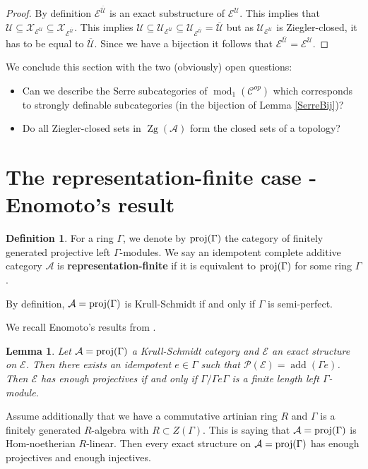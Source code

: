 \documentclass[11pt,a4paper]{amsart}
\theoremstyle{plain}
\newtheorem{lem}[thm]{Lemma}
\theoremstyle{definition}
\newtheorem{dfn}[thm]{Definition}
\DeclareMathOperator{\modu}{mod}
\newcommand{\mcA}{\mathcal{A}}
\newcommand{\mcC}{\mathcal{C}}
\newcommand{\mcE}{\mathcal{E}}
\newcommand{\mcP}{\mathcal{P}}
\newcommand{\mcU}{\mathcal{U}}
\newcommand{\mcX}{\mathcal{X}}
\DeclareMathOperator{\Zg}{Zg}
\DeclareMathOperator{\add}{add}
\begin{document}
\begin{proof}
By definition $\mcE^{\overline{\mcU}}$ is an exact substructure of $\mcE^{\mcU}$. This implies that $\mcU \subseteq \mcX_{\mcE^{\mcU}} \subseteq \mcX_{\mcE^{\overline{\mcU}}}$. This implies $\mcU\subseteq \mcU_{\mcE^{\mcU}}\subseteq \mcU_{\mcE^{\overline{\mcU}}}=\overline{\mcU}$ but as $\mcU_{\mcE^{\mcU}}$ is Ziegler-closed, it has to be equal to $\overline{\mcU}$. Since we have a bijection it follows that $\mcE^{\overline{\mcU}}=\mcE^{\mcU}$. 
\end{proof}

We conclude this section with the two (obviously) open  questions: 
\begin{itemize}
\item[(1)] Can we describe the Serre subcategories of $\modu_1(\mcC^{op})$ which corresponds to strongly definable subcategories (in the bijection of Lemma \ref{SerreBij})?
\item[(2)] Do all Ziegler-closed sets in $\Zg (\mcA)$ form the closed sets of a topology?
\end{itemize}


\section{The representation-finite case - Enomoto's result}



\begin{dfn} 
For a ring $\Gamma$, we denote by $\rm{proj}(\Gamma)$ the category of finitely generated projective left $\Gamma$-modules. 
We say an idempotent complete additive category $\mcA$ is \textbf{representation-finite} if it is equivalent to $\rm{proj}(\Gamma)$ for some ring $\Gamma$. 
\end{dfn}

By definition, $\mcA=\rm{proj} (\Gamma)$ is Krull-Schmidt if and only if $\Gamma$ is semi-perfect. 

We recall Enomoto's results from \cite[section 3]{E}.

\begin{lem} Let $\mcA=\rm{proj} (\Gamma )$ a Krull-Schmidt category and $\mcE$ an exact structure on $\mcE$. Then there exists an idempotent $e\in \Gamma$ such that $\mcP(\mcE) = \add (\Gamma e)$. Then $\mcE$ has enough projectives if and only if $\Gamma / \Gamma e \Gamma$ is a finite length left $\Gamma$-module. 
\end{lem}


Assume additionally that we have a commutative artinian ring $R$ and $\Gamma$ is a finitely generated $R$-algebra with $R \subset Z(\Gamma)$. This is saying that $\mcA=\rm{proj} (\Gamma)$ is Hom-noetherian $R$-linear. Then every exact structure on $\mcA= \rm{proj} (\Gamma )$ has enough projectives and enough injectives. 
\end{document}
